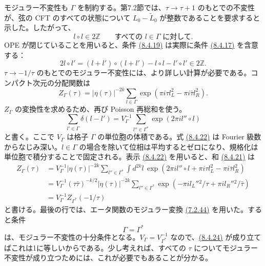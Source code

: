モジュラー不変性も $\Gamma$ を制約する。第7.2節では、$\tau\to\tau+1$ のもとでの不変性が、弦の CFT のすべての状態について $L_0-\widetilde L_0$ が整数であることを要求すると示した。したがって、
\begin{equation}
l\circ l\in2\mathbb Z\qquad\text{すべての }l\in\Gamma\text{ に対して}.
\tag{8.4.19}\label{eq:8.4.19}
\end{equation}
OPE が閉じていることを用いると、条件 \hyperref[eq:8.4.19]{(8.4.19)} は実際に条件 \hyperref[eq:8.4.17]{(8.4.17)} を含意する：
\begin{equation}
2l\circ l'=(l+l')\circ(l+l')-l\circ l-l'\circ l'\in2\mathbb Z.
\tag{8.4.20}\label{eq:8.4.20}
\end{equation}
$\tau\to-1/\tau$ のもとでのモジュラー不変性には、より詳しい計算が必要である。コンパクト次元の分配関数は
\begin{equation}
Z_\Gamma(\tau)=|\eta(\tau)|^{-2k}\sum_{l\in\Gamma}
\exp(\pi i\tau l_L^2-\pi i\bar\tau l_R^2).
\tag{8.4.21}\label{eq:8.4.21}
\end{equation}
$Z_\Gamma$ の変換性を求めるため、再び Poisson 再総和を使う。
\begin{equation}
\sum_{l'\in\Gamma}\delta(l-l')=V_\Gamma^{-1}
\sum_{l''\in\Gamma^*}\exp(2\pi il''\circ l)
\tag{8.4.22}\label{eq:8.4.22}
\end{equation}
と書く。ここで $V_\Gamma$ は格子 $\Gamma$ の単位胞の体積である。式 \hyperref[eq:8.4.22]{(8.4.22)} は Fourier 級数からなじみ深い。$l\in\Gamma$ の場合を除いて位相は平均するとゼロになり、規格化は単位胞で積分することで固定される。表示 \hyperref[eq:8.4.22]{(8.4.22)} を用いると、和 \hyperref[eq:8.4.21]{(8.4.21)} は
\begin{equation}
\begin{aligned}
Z_\Gamma(\tau)&=V_\Gamma^{-1}|\eta(\tau)|^{-2k}\sum_{l''\in\Gamma^*}
\int d^{2k}l\,\exp(2\pi il''\circ l+\pi i\tau l_L^2-\pi i\bar\tau l_R^2)\\
&=V_\Gamma^{-1}(\tau\bar\tau)^{-k/2}|\eta(\tau)|^{-2k}
\sum_{l''\in\Gamma^*}\exp(-\pi il_L''{}^2/\tau+\pi il_R''{}^2/\bar\tau)\\
&=V_\Gamma^{-1}Z_{\Gamma^*}(-1/\tau)
\end{aligned}
\tag{8.4.23}\label{eq:8.4.23}
\end{equation}
と書ける。最後の行では、エータ関数のモジュラー変換 \hyperref[eq:7.2.44b]{(7.2.44)} を用いた。すると条件
\begin{equation}
\Gamma=\Gamma^*
\tag{8.4.24}\label{eq:8.4.24}
\end{equation}
は、モジュラー不変性の十分条件となる。$V_\Gamma=V_{\Gamma^*}^{-1}$ なので、\hyperref[eq:8.4.24]{(8.4.24)} が成り立てばこれは1に等しいからである。少し考えれば、すべての $\tau$ についてモジュラー不変性が成り立つためには、これが必要でもあることが分かる。

